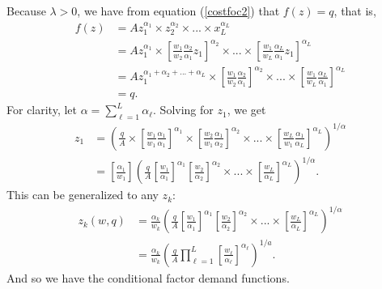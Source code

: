 \documentclass[12pt]{article}
\theoremstyle{definition}
\begin{document}
Because $\lambda >0$, we have from equation (\ref{costfoc2}) that $f(z)=q$, that is,
\begin{align*}
		f(z) &= Az_1^{\alpha_1} \times z_2^{\alpha_2} \times ... \times x_L^{\alpha_L} \\	
			&= 	Az_1^{\alpha_1} \times \left[\frac{w_1}{w_2}\frac{\alpha_2}{\alpha_1} z_1 \right]^{\alpha_2} \times ... \times \left[ \frac{w_1}{w_L}\frac{\alpha_L}{\alpha_1} z_1 \right]^{\alpha_L} \\
			& =A z_1^{\alpha _ 1 + \alpha_2 + ... + \alpha_L} \times \left[\frac{w_1}{w_2}\frac{\alpha_2}{\alpha_1}  \right]^{\alpha_2} \times ... \times \left[ \frac{w_1}{w_L}\frac{\alpha_L}{\alpha_1}  \right]^{\alpha_L} \\
			& = q.
\end{align*}
For clarity, let $\alpha = \sum_{{\ell}=1}^L \alpha_{\ell}$. Solving for $z_1$, we get
\begin{align*}
		z_1 &=\left ( \frac{q}{A} \times \left[\frac{w_1}{w_1}\frac{\alpha_1}{\alpha_1} \right ]^{\alpha_1} \times \left[\frac{w_2}{w_1}\frac{\alpha_1}{\alpha_2}  \right]^{\alpha_2} \times ... \times \left[ \frac{w_L}{w_1}\frac{\alpha_1}{\alpha_L}  \right]^{\alpha_L} \right)^{1 / \alpha} \\
		& = \left[ \frac{\alpha_1}{w_1} \right] \left (  \frac{q}{A} \left[ \frac{w_1}{\alpha_1}\right]^{\alpha_1}\left[ \frac{w_2}{\alpha_2}\right]^{\alpha_2 } \times ... \times \left[ \frac{w_L}{\alpha_L}\right]^{\alpha_L } \right)^{1 / \alpha}.
\end{align*}
This can be generalized to any $z_k$:
\begin{align*}
	z_k(w,q) &=  \frac{\alpha_k}{w_k}  \left (  \frac{q}{A} \left[ \frac{w_1}{\alpha_1}\right]^{\alpha_1}\left[ \frac{w_2}{\alpha_2}\right]^{\alpha_2 } \times ... \times \left[ \frac{w_L}{\alpha_L}\right]^{\alpha_L } \right)^{1 / \alpha} \\
		& = \frac{\alpha_k}{w_k} \left( \frac{q}{A} \prod_{{\ell}=1}^L \left[\frac{w_{\ell}}{\alpha_{\ell}} \right ] ^{\alpha_{\ell}} \right)^{1 / a}.
\end{align*}
And so we have the conditional factor demand functions. 
\end{document}
